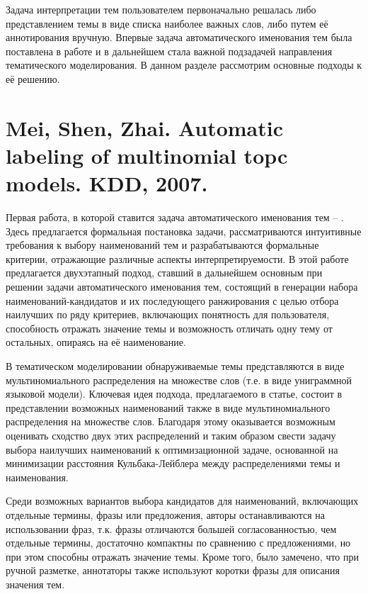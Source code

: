 Задача интерпретации тем пользователем первоначально решалась либо представлением темы в виде списка наиболее важных слов, либо путем её аннотирования вручную. Впервые задача автоматического именования тем была поставлена в работе \parencite{mei2007automatic} и в дальнейшем стала важной подзадачей направления тематического моделирования. В данном разделе рассмотрим основные подходы к её решению.

\section{Mei, Shen, Zhai. Automatic labeling of multinomial topc models. KDD, 2007.}

Первая работа, в которой ставится задача автоматического именования тем -- \parencite{mei2007automatic}. Здесь предлагается формальная постановка задачи, рассматриваются интуитивные требования к выбору наименований тем и разрабатываются формальные критерии, отражающие различные аспекты интерпретируемости. В этой работе предлагается двухэтапный подход, ставший в дальнейшем основным при решении задачи автоматического именования тем, состоящий в генерации набора  наименований-кандидатов и их последующего ранжирования с целью отбора наилучших по ряду критериев, включающих понятность для пользователя, способность отражать значение темы и возможность отличать одну тему от остальных, опираясь на её наименование.

В тематическом моделировании обнаруживаемые темы представляются в виде мультиномиального распределения на множестве слов (т.е. в виде униграммной языковой модели). Ключевая идея подхода, предлагаемого в статье, состоит в представлении возможных наименований также в виде мультиномиального распределения на множестве слов. Благодаря этому оказывается возможным оценивать сходство двух этих распределений и таким образом свести задачу выбора наилучших наименований к оптимизационной задаче, основанной на минимизации расстояния Кульбака-Лейблера между распределениями темы и наименования.

Среди возможных вариантов выбора кандидатов для наименований, включающих отдельные термины, фразы или предложения, авторы останавливаются на использовании фраз, т.к. фразы отличаются большей согласованностью, чем отдельные термины, достаточно компактны по сравнению с предложениями, но при этом способны отражать значение темы. Кроме того, было замечено, что при ручной разметке, аннотаторы также используют коротки фразы для описания значения тем.

